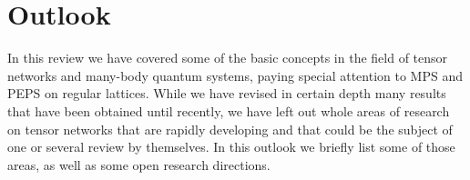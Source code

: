 \documentclass[rmp,aps,reprint,superscriptaddress,nobalancelastpage]{revtex4-1}
\begin{document}
    \section{Outlook\label{sec:5-outlook}}

    In this review we have covered some of the basic concepts in the field of tensor networks and many-body quantum systems, paying special attention to MPS and PEPS on regular lattices. While we have revised in certain depth many results that have been obtained until recently, we have left out whole areas of research on tensor networks that are rapidly developing and that could be the subject of one or several review by themselves. In this outlook we briefly list some of those areas, as well as some open research directions.
\end{document}
